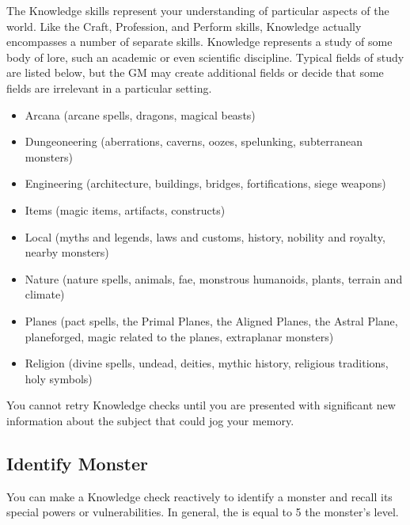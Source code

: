 \newpage
{}
    The Knowledge skills represent your understanding of particular aspects of the world.
    Like the Craft, Profession, and Perform skills, Knowledge actually encompasses a number of separate skills.
    Knowledge represents a study of some body of lore, such an academic or even scientific discipline.
    Typical fields of study are listed below, but the GM may create additional fields or decide that some fields are irrelevant in a particular setting.
        \begin{itemize}
            \item Arcana (arcane spells, dragons, magical beasts)
            \item Dungeoneering (aberrations, caverns, oozes, spelunking, subterranean monsters)
            \item Engineering (architecture, buildings, bridges, fortifications, siege weapons)
            \item Items (magic items, artifacts, constructs)
            \item Local (myths and legends, laws and customs, history, nobility and royalty, nearby monsters)
            \item Nature (nature spells, animals, fae, monstrous humanoids, plants, terrain and climate)
            \item Planes (pact spells, the Primal Planes, the Aligned Planes, the Astral Plane,
                planeforged, magic related to the planes, extraplanar monsters)
            \item Religion (divine spells, undead, deities, mythic history, religious traditions, holy symbols)
        \end{itemize}

        You cannot retry Knowledge checks until you are presented with significant new information about the subject that could jog your memory.

    \subsection{Identify Monster}
        You can make a Knowledge check reactively to identify a monster and recall its special powers or vulnerabilities.
        In general, the  is equal to 5 \add the monster's level.

